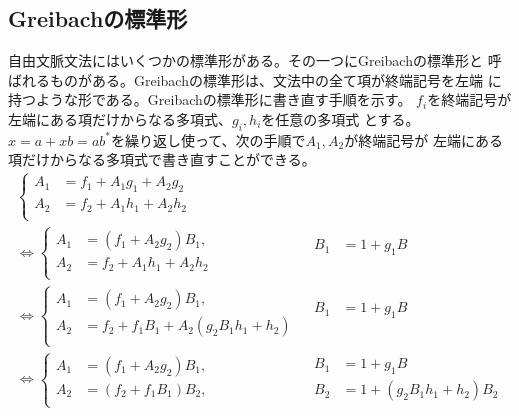 {\subsection{Greibachの標準形}\label{s2:Greibachの標準形} %
	自由文脈文法にはいくつかの標準形がある。その一つにGreibachの標準形と
	呼ばれるものがある。Greibachの標準形は、文法中の全て項が終端記号を左端
	に持つような形である。Greibachの標準形に書き直す手順を示す。
	$f_i$を終端記号が左端にある項だけからなる多項式、$g_i,h_i$を任意の多項式
	とする。$x=a+xb=ab^*$を繰り返し使って、次の手順で$A_1,A_2$が終端記号が
	左端にある項だけからなる多項式で書き直すことができる。
	\begin{equation*}\begin{array}{ll}
		\left\{\begin{split}
			A_1 &= f_1 + A_1g_1 + A_2 g_2 \\
			A_2 &= f_2 + A_1h_1 + A_2 h_2 \\
		\end{split}\right. \\
		\iff \left\{\begin{split}
			A_1 &= (f_1 + A_2g_2)B_1, \\
			A_2 &= f_2 + A_1h_1 + A_2 h_2 \\
		\end{split}\right. & \begin{split}
			B_1 &=  1 + g_1B \\
			\\
		\end{split} \\
		\iff \left\{\begin{split}
			A_1 &= (f_1 + A_2g_2)B_1, \\
			A_2 &= f_2 + f_1B_1 + A_2(g_2B_1h_1 + h_2) \\
		\end{split}\right. & \begin{split}
			B_1 &=  1 + g_1B \\
			\\
		\end{split} \\
		\iff \left\{\begin{split}
			A_1 &= (f_1 + A_2g_2)B_1, \\
			A_2 &= (f_2 + f_1B_1)B_2, \\
		\end{split}\right. & \begin{split}
			B_1 &= 1 + g_1B \\
			B_2 &= 1 + (g_2B_1h_1 + h_2)B_2 
		\end{split} \\

\end{array}
\end{equation*}}
